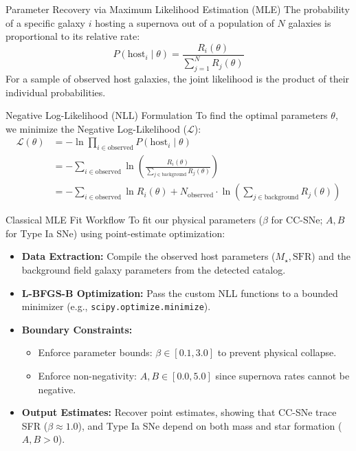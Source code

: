 \documentclass[9pt]{beamer}
\begin{document}
\begin{frame}{Parameter Recovery via Maximum Likelihood Estimation (MLE)}
  The probability of a specific galaxy $i$ hosting a supernova out of a population of $N$ galaxies is proportional to its relative rate:
  $$P(\text{host}_i \mid \theta) = \frac{R_i(\theta)}{\sum_{j=1}^N R_j(\theta)}$$
  For a sample of observed host galaxies, the joint likelihood is the product of their individual probabilities.
  \begin{block}{Negative Log-Likelihood (NLL) Formulation}
    To find the optimal parameters $\theta$, we minimize the Negative Log-Likelihood ($\mathcal{L}$):
    \begin{align*}
      \mathcal{L}(\theta) &= - \ln \prod_{i \in \text{observed}} P(\text{host}_i \mid \theta) \\
      &= - \sum_{i \in \text{observed}} \ln \left( \frac{R_i(\theta)}{\sum_{j \in \text{background}} R_j(\theta)} \right) \\
      &= -\sum_{i \in \text{observed}} \ln R_i(\theta) + N_{\text{observed}} \cdot \ln \left(\sum_{j \in \text{background}} R_j(\theta)\right)
    \end{align*}
  \end{block}
\end{frame}

\begin{frame}{Classical MLE Fit Workflow}
  To fit our physical parameters ($\beta$ for CC-SNe; $A, B$ for Type Ia SNe) using point-estimate optimization:
  \begin{itemize}
    \item \textbf{Data Extraction:} Compile the observed host parameters ($M_\star, \text{SFR}$) and the background field galaxy parameters from the detected catalog.
    \item \textbf{L-BFGS-B Optimization:} Pass the custom NLL functions to a bounded minimizer (e.g., \texttt{scipy.optimize.minimize}).
    \item \textbf{Boundary Constraints:}
      \begin{itemize}
        \item Enforce parameter bounds: $\beta \in [0.1, 3.0]$ to prevent physical collapse.
        \item Enforce non-negativity: $A, B \in [0.0, 5.0]$ since supernova rates cannot be negative.
      \end{itemize}
    \item \textbf{Output Estimates:} Recover point estimates, showing that CC-SNe trace SFR ($\beta \approx 1.0$), and Type Ia SNe depend on both mass and star formation ($A, B > 0$).
  \end{itemize}
\end{frame}
\end{document}
